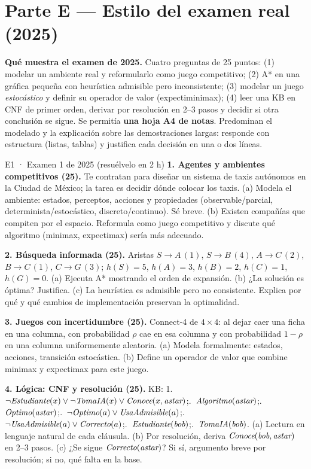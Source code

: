 \newpage
\section{Parte E — Estilo del examen real (2025)}

\begin{nota}
\textbf{Qué muestra el examen de 2025.} Cuatro preguntas de 25 puntos: (1) modelar un ambiente real y
reformularlo como juego competitivo; (2) A* en una gráfica pequeña con heurística admisible pero
inconsistente; (3) modelar un juego \emph{estocástico} y definir su operador de valor
(expectiminimax); (4) leer una KB en CNF de primer orden, derivar por resolución en 2–3 pasos y decidir
si otra conclusión se sigue. Se permitía \textbf{una hoja A4 de notas}. Predominan el modelado y la
explicación sobre las demostraciones largas: responde con estructura (listas, tablas) y justifica cada
decisión en una o dos líneas.
\end{nota}

\begin{ejercicio}{E1 · Examen 1 de 2025 (resuélvelo en 2 h) }
\textbf{1. Agentes y ambientes competitivos (25).} Te contratan para diseñar un sistema de taxis
autónomos en la Ciudad de México; la tarea es decidir dónde colocar los taxis.
(a)  Modela el ambiente: estados, perceptos, acciones y propiedades (observable/parcial,
determinista/estocástico, discreto/continuo). Sé breve.
(b)  Existen compañías que compiten por el espacio. Reformula como juego competitivo y discute
qué algoritmo (minimax, expectimax) sería más adecuado.

\textbf{2. Búsqueda informada (25).} Aristas $S\to A\,(1)$, $S\to B\,(4)$, $A\to C\,(2)$, $B\to C\,(1)$, $C\to G\,(3)$;
$h(S)=5$, $h(A)=3$, $h(B)=2$, $h(C)=1$, $h(G)=0$.
(a)  Ejecuta A* mostrando el orden de expansión. (b)  ¿La solución es óptima? Justifica.
(c)  La heurística es admisible pero no consistente. Explica por qué y qué cambios de
implementación preservan la optimalidad.

\textbf{3. Juegos con incertidumbre (25).} Connect-4 de $4\times4$: al dejar caer una ficha en una columna,
con probabilidad $\rho$ cae en esa columna y con probabilidad $1-\rho$ en una columna uniformemente aleatoria.
(a)  Modela formalmente: estados, acciones, transición estocástica.
(b)  Define un operador de valor que combine minimax y expectimax para este juego.

\textbf{4. Lógica: CNF y resolución (25).} KB:
1.\ $\neg\textit{Estudiante}(x)\vee\neg\textit{TomaIA}(x)\vee\textit{Conoce}(x,\textit{astar})$;.\ $\textit{Algoritmo}(\textit{astar})$;.\ $\textit{Optimo}(\textit{astar})$;.\ $\neg\textit{Optimo}(a)\vee\textit{UsaAdmisible}(a)$;.\ $\neg\textit{UsaAdmisible}(a)\vee\textit{Correcto}(a)$;.\ $\textit{Estudiante}(\textit{bob})$;.\ $\textit{TomaIA}(\textit{bob})$.
(a)  Lectura en lenguaje natural de cada cláusula. (b)  Por resolución, deriva
$\textit{Conoce}(\textit{bob},\textit{astar})$ en 2–3 pasos. (c)  ¿Se sigue $\textit{Correcto}(\textit{astar})$? Si sí, argumento
breve por resolución; si no, qué falta en la base.
\end{ejercicio}

